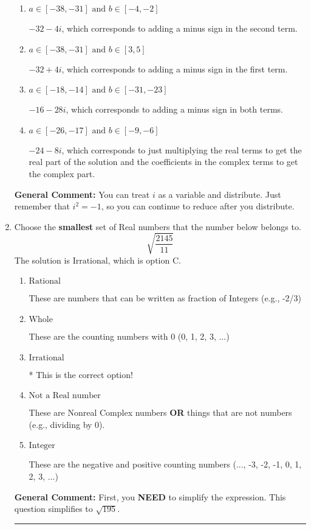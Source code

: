 \documentclass{extbook}[14pt]
\newcommand{\litem}[1]{\item #1

\rule{\textwidth}{0.4pt}}
\begin{document}
\begin{enumerate}
{\begin{enumerate}[label=\Alph*.]
* $-16 + 28 i$, which is the correct option.
\item \( a \in [-38, -31] \text{ and } b \in [-4, -2] \)

 $-32 - 4 i$, which corresponds to adding a minus sign in the second term.
\item \( a \in [-38, -31] \text{ and } b \in [3, 5] \)

 $-32 + 4 i$, which corresponds to adding a minus sign in the first term.
\item \( a \in [-18, -14] \text{ and } b \in [-31, -23] \)

 $-16 - 28 i$, which corresponds to adding a minus sign in both terms.
\item \( a \in [-26, -17] \text{ and } b \in [-9, -6] \)

 $-24 - 8 i$, which corresponds to just multiplying the real terms to get the real part of the solution and the coefficients in the complex terms to get the complex part.
\end{enumerate}

\textbf{General Comment:} You can treat $i$ as a variable and distribute. Just remember that $i^2=-1$, so you can continue to reduce after you distribute.
}
\litem{
Choose the \textbf{smallest} set of Real numbers that the number below belongs to.
\[ \sqrt{\frac{2145}{11}} \]The solution is \( \text{Irrational} \), which is option C.\begin{enumerate}[label=\Alph*.]
\item \( \text{Rational} \)

These are numbers that can be written as fraction of Integers (e.g., -2/3)
\item \( \text{Whole} \)

These are the counting numbers with 0 (0, 1, 2, 3, ...)
\item \( \text{Irrational} \)

* This is the correct option!
\item \( \text{Not a Real number} \)

These are Nonreal Complex numbers \textbf{OR} things that are not numbers (e.g., dividing by 0).
\item \( \text{Integer} \)

These are the negative and positive counting numbers (..., -3, -2, -1, 0, 1, 2, 3, ...)
\end{enumerate}

\textbf{General Comment:} First, you \textbf{NEED} to simplify the expression. This question simplifies to $\sqrt{195}$. 
 
}
\end{enumerate}
\end{document}
